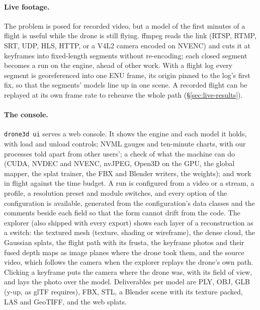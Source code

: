 \documentclass[10pt,a4paper,twocolumn]{article}
\begin{document}
\paragraph{Live footage.} The problem is posed for recorded video, but a model of the first minutes of a flight is useful while the drone is still flying. ffmpeg reads the link (RTSP, RTMP, SRT, UDP, HLS, HTTP, or a V4L2 camera encoded on NVENC) and cuts it at keyframes into fixed-length segments without re-encoding; each closed segment becomes a run on the engine, ahead of other work. With a flight log every segment is georeferenced into one ENU frame, its origin pinned to the log's first fix, so that the segments' models line up in one scene. A recorded flight can be replayed at its own frame rate to rehearse the whole path (\S\ref{sec:live-results}).

\paragraph{The console.} \texttt{drone3d ui} serves a web console. It shows the engine and each model it holds, with load and unload controls; NVML gauges and ten-minute charts, with our processes told apart from other users'; a check of what the machine can do (CUDA, NVDEC and NVENC, nvJPEG, Open3D on the GPU, the global mapper, the splat trainer, the FBX and Blender writers, the weights); and work in flight against the time budget. A run is configured from a video or a stream, a profile, a resolution preset and module switches, and every option of the configuration is available, generated from the configuration's data classes and the comments beside each field so that the form cannot drift from the code. The explorer (also shipped with every export) shows each layer of a reconstruction as a switch: the textured mesh (texture, shading or wireframe), the dense cloud, the Gaussian splats, the flight path with its frusta, the keyframe photos and their fused depth maps as image planes where the drone took them, and the source video, which follows the camera when the explorer replays the drone's own path. Clicking a keyframe puts the camera where the drone was, with its field of view, and lays the photo over the model. Deliverables per model are PLY, OBJ, GLB (y-up, as glTF requires), FBX, STL, a Blender scene with its texture packed, LAS and GeoTIFF, and the web splats.
\end{document}

